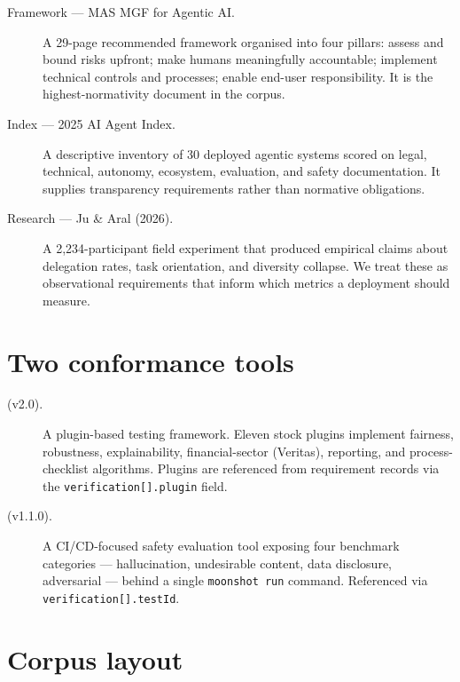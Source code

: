 \begin{description}
  \item[Framework --- MAS MGF for Agentic AI.] A 29-page recommended
    framework organised into four pillars: assess and bound risks upfront;
    make humans meaningfully accountable; implement technical controls and
    processes; enable end-user responsibility. It is the highest-normativity
    document in the corpus.
  \item[Index --- 2025 AI Agent Index.] A descriptive inventory of 30
    deployed agentic systems scored on legal, technical, autonomy,
    ecosystem, evaluation, and safety documentation. It supplies
    transparency requirements rather than normative obligations.
  \item[Research --- Ju \& Aral (2026).] A 2{,}234-participant field
    experiment that produced empirical claims about delegation rates, task
    orientation, and diversity collapse. We treat these as observational
    requirements that inform which metrics a deployment should measure.
\end{description}

\section{Two conformance tools}

\begin{description}
  \item[ (v2.0).] A plugin-based testing framework. Eleven
    stock plugins implement fairness, robustness, explainability,
    financial-sector (Veritas), reporting, and process-checklist
    algorithms. Plugins are referenced from requirement records via the
    \texttt{verification[].plugin} field.
  \item[ (v1.1.0).] A CI/CD-focused safety evaluation
    tool exposing four benchmark categories --- hallucination, undesirable
    content, data disclosure, adversarial --- behind a single
    \texttt{moonshot run} command. Referenced via
    \texttt{verification[].testId}.
\end{description}

\section{Corpus layout}

